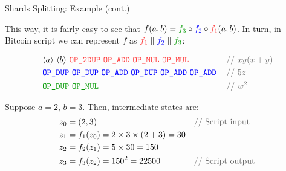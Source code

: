 \documentclass{zkdl-presentation-template}
\newcommand{\elem}[1]{\, \langle #1 \rangle \,}
\newcommand{\opcode}[1]{\, \texttt{#1} \,}
\begin{document}
  \begin{frame}{Shards Splitting: Example (cont.)}  
    \begin{example}
        This way, it is fairly easy to see that $f(a,b) =
    \textcolor{green!60!black}{f_3} \circ \textcolor{blue}{f_2} \circ
    \textcolor{red!80!white}{f_1}(a,b)$. In turn, in Bitcoin script we can
    represent $f$ as $\textcolor{red!80!white}{f_1} \parallel
    \textcolor{blue}{f_2} \parallel \textcolor{green!60!black}{f_3}$:
        \begin{empheqboxed}
            \scriptsize
            \begin{align*}
                &\elem{a} \elem{b} \textcolor{red!80!white}{\opcode{\texttt{OP\_2DUP}} \opcode{\texttt{OP\_ADD}} \opcode{\texttt{OP\_MUL}} \opcode{\texttt{OP\_MUL}}} && \textcolor{gray!80!black}{\text{// $xy(x+y)$}} \\
                &\textcolor{blue}{\opcode{\texttt{OP\_DUP}} \opcode{\texttt{OP\_DUP}} \opcode{\texttt{OP\_ADD}} \opcode{\texttt{OP\_DUP}} \opcode{\texttt{OP\_ADD}} \opcode{\texttt{OP\_ADD}}} && \textcolor{gray!80!black}{\text{// $5z$}} \\
                &\textcolor{green!60!black}{\opcode{\texttt{OP\_DUP}} \opcode{\texttt{OP\_MUL}}}&&\textcolor{gray!80!black}{\text{// $w^2$}}
            \end{align*}
        \end{empheqboxed}
        \pause Suppose $a=2$, $b=3$. Then, intermediate states are:
        \begin{align*}
            & z_0 = (2,3) && \textcolor{gray!80!black}{\text{// Script input}} \\
            & z_1 = f_1(z_0) = 2 \times 3 \times (2+3) = 30 && \\ 
            & z_2 = f_2(z_1) = 5 \times 30 = 150 && \\
            & z_3 = f_3(z_2) = 150^2 = 22500 && \textcolor{gray!80!black}{\text{// Script output}}
        \end{align*}
    \end{example}
  \end{frame}
\end{document}
